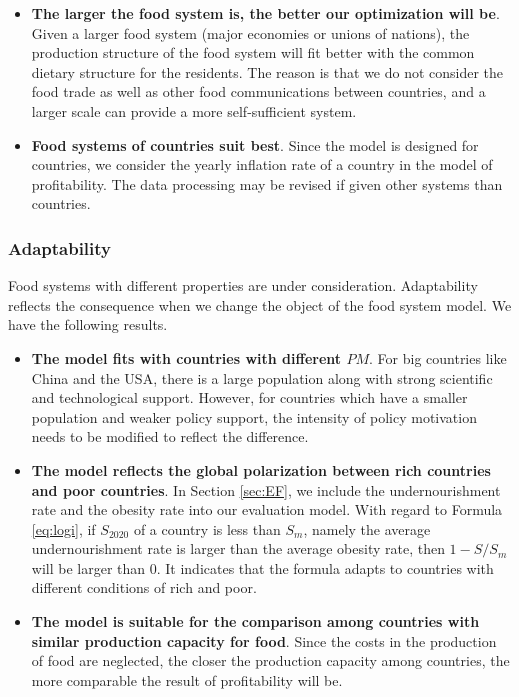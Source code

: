 \documentclass[12pt]{article}
\begin{document}
\begin{itemize}
    \item \textbf{The larger the food system is, the better our optimization will be}. Given a larger food system (major economies or unions of nations), the production structure of the food system will fit better with the common dietary structure for the residents. The reason is that we do not consider the food trade as well as other food communications between countries, and a larger scale can provide a more self-sufficient system.
    \item \textbf{Food systems of countries suit best}. Since the model is designed for countries, we consider the yearly inflation rate of a country in the model of profitability. The data processing may be revised if given other systems than countries.
\end{itemize}

\subsubsection{Adaptability}

Food systems with different properties are under consideration. Adaptability reflects the consequence when we change the object of the food system model. We have the following results.

\begin{itemize}
    \item \textbf{The model fits with countries with different $PM$}. For big countries like China and the USA, there is a large population along with strong scientific and technological support. However, for countries which have a smaller population and weaker policy support, the intensity of policy motivation needs to be modified to reflect the difference.
    \item \textbf{The model reflects the global polarization between rich countries and poor countries}. In Section \ref{sec:EF}, we include the undernourishment rate and the obesity rate into our evaluation model. With regard to Formula \eqref{eq:logi}, if $S_{2020}$ of a country is less than $S_m$, namely the average undernourishment rate is larger than the average obesity rate, then $1-S/S_m$ will be larger than 0. It indicates that the formula adapts to countries with different conditions of rich and poor.
    \item \textbf{The model is suitable for the comparison among countries with similar production capacity for food}. Since the costs in the production of food are neglected, the closer the production capacity among countries, the more comparable the result of profitability will be.
\end{itemize}
\end{document}
